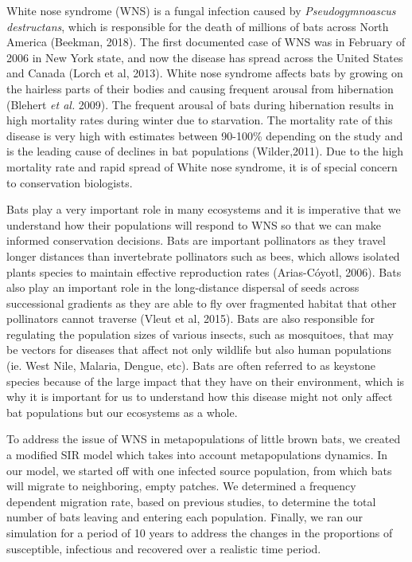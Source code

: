 \documentclass[12pt]{article}
\begin{document}
White nose syndrome (WNS) is a fungal infection caused by \textit{Pseudogymnoascus destructans}, which is responsible for the death of millions of bats across North America (Beekman, 2018). The first documented case of WNS was in February of 2006 in New York state, and now the disease has spread across the United States and Canada (Lorch et al, 2013). White nose syndrome affects bats by growing on the hairless parts of their bodies and causing frequent arousal from hibernation (Blehert \textit{et al.} 2009). The frequent arousal of bats during hibernation results in high mortality rates during winter due to starvation. The mortality rate of this disease is very high with estimates between 90-100\% depending on the study and is the leading cause of declines in bat populations (Wilder,2011). Due to the high mortality rate and rapid spread of White nose syndrome, it is of special concern to conservation biologists.

Bats play a very important role in many ecosystems and it is imperative that we understand how their populations will respond to WNS so that we can make informed conservation decisions. Bats are important pollinators as they travel longer distances than invertebrate pollinators such as bees, which allows isolated plants species to maintain effective reproduction rates (Arias-Cóyotl, 2006). Bats also play an important role in the long-distance dispersal of seeds across successional gradients as they are able to fly over fragmented habitat that other pollinators cannot traverse (Vleut et al, 2015).  Bats are also responsible for regulating the population sizes of various insects, such as mosquitoes, that may be vectors for diseases that affect not only wildlife but also human populations (ie. West Nile, Malaria, Dengue, etc). Bats are often referred to as keystone species because of the large impact that they have on their environment, which is why it is important for us to understand how this disease might not only affect bat populations but our ecosystems as a whole.

To address the issue of WNS in metapopulations of little brown bats, we created a modified SIR model which takes into account metapopulations dynamics. In our model, we started off with one infected source population, from which bats will migrate to neighboring, empty patches. We determined a frequency dependent migration rate, based on previous studies, to determine the total number of bats leaving and entering each population. Finally, we ran our simulation for a period of 10 years to address the changes in the proportions of susceptible, infectious and recovered over a realistic time period. 
\end{document}
